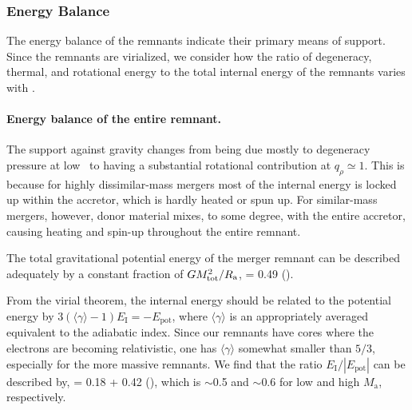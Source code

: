 \subsubsection{Energy Balance}

The energy balance of the remnants indicate their primary means of support.  Since the remnants are virialized, we consider how the ratio of degeneracy, thermal, and rotational energy to the total internal energy of the remnants varies with \qrho.

\paragraph{Energy balance of the entire remnant.} The support against gravity changes from being due mostly to degeneracy pressure at low \qrho\ to having a substantial rotational contribution at $q_\rho\simeq1$.  This is because for highly dissimilar-mass mergers most of the internal energy is locked up within the accretor, which is hardly heated or spun up.  For similar-mass mergers, however, donor material mixes, to some degree, with the entire accretor, causing heating and spin-up throughout the entire remnant.

The total gravitational potential energy of the merger remnant can be described adequately by a constant fraction of $GM_\mrm{tot}^2/\Ra$,
\eqbegin
{} = 0.49
\qquad().
\eqend


From the virial theorem, the internal energy should be related to the potential energy by $3(\langle\gamma\rangle - 1)E_\mathrm{I} = -E_\mathrm{pot}$, where $\langle\gamma\rangle$ is an appropriately averaged equivalent to the adiabatic index.  Since our remnants have cores where the electrons are becoming relativistic, one has $\langle\gamma\rangle$ somewhat smaller than $5/3$, especially for the more massive remnants.  We find that the ratio $E_\mathrm{I}/|E_\mathrm{pot}|$ can be described by,
\eqbegin
{} = 0.18 + 0.42
\qquad(),
\eqend
which is $\sim$0.5 and $\sim$0.6 for low and high $M_\mathrm{a}$, respectively.  

